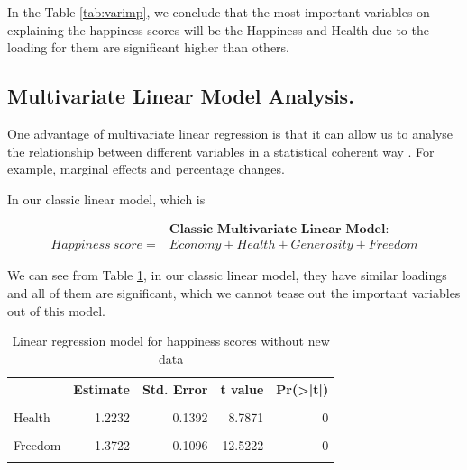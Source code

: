 \documentclass[11pt,a4paper,]{article}
\begin{document}
In the Table \ref{tab:varimp}, we conclude that the most important variables on explaining the happiness scores will be the Happiness and Health due to the loading for them are significant higher than others.

\hypertarget{multivariate-linear-model-analysis.}{%
\subsection{Multivariate Linear Model Analysis.}\label{multivariate-linear-model-analysis.}}

One advantage of multivariate linear regression is that it can allow us to analyse the relationship between different variables in a statistical coherent way \textcite{voxco2022}. For example, marginal effects and percentage changes.

In our classic linear model, which is

\[
\begin{aligned}
&\textbf{Classic Multivariate Linear Model}:\\
Happiness\ score=& Economy+Health+Generosity+Freedom
\end{aligned}
\]

We can see from Table \ref{tab:without}, in our classic linear model, they have similar loadings and all of them are significant, which we cannot tease out the important variables out of this model.

\begin{table}

\caption{\label{tab:without}Linear regression model for happiness scores without new data}
\centering
\begin{tabular}[t]{l|r|r|r|r}
\hline
  & Estimate & Std. Error & t value & Pr(>|t|)\\
\hline
\cellcolor{gray!6}{(Intercept)} & \cellcolor{gray!6}{2.4374} & \cellcolor{gray!6}{0.0753} & \cellcolor{gray!6}{32.3704} & \cellcolor{gray!6}{0}\\
\hline
Health & 1.2232 & 0.1392 & 8.7871 & 0\\
\hline
\cellcolor{gray!6}{Economy} & \cellcolor{gray!6}{1.4543} & \cellcolor{gray!6}{0.0842} & \cellcolor{gray!6}{17.2820} & \cellcolor{gray!6}{0}\\
\hline
Freedom & 1.3722 & 0.1096 & 12.5222 & 0\\
\hline
\cellcolor{gray!6}{Generosity} & \cellcolor{gray!6}{1.1702} & \cellcolor{gray!6}{0.1397} & \cellcolor{gray!6}{8.3785} & \cellcolor{gray!6}{0}\\
\hline
\end{tabular}
\end{table}
\end{document}

